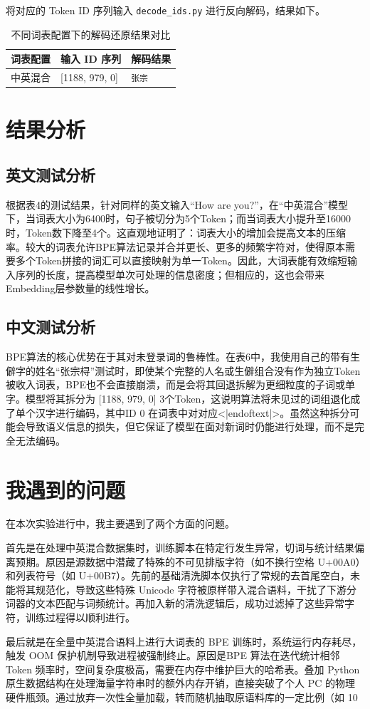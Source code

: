 \documentclass[a4paper,12pt]{ctexart} %
\begin{document}
将对应的 Token ID 序列输入 \texttt{decode\_ids.py} 进行反向解码，结果如下。

\begin{table}[H]
    \centering
    \begin{tabular}{p{} p{} p{}}
        \toprule
        词表配置 & 输入 ID 序列 & 解码结果 \\
        \midrule
        中英混合 & [1188, 979, 0] & \texttt{张宗 } \\
        \bottomrule
    \end{tabular}
    \caption{不同词表配置下的解码还原结果对比}
\end{table}



\section{结果分析}
\subsection{英文测试分析}
根据表4的测试结果，针对同样的英文输入“How are you?”，在“中英混合”模型下，当词表大小为6400时，句子被切分为5个Token；而当词表大小提升至16000时，Token数下降至4个。这直观地证明了：词表大小的增加会提高文本的压缩率。较大的词表允许BPE算法记录并合并更长、更多的频繁字符对，使得原本需要多个Token拼接的词汇可以直接映射为单一Token。因此，大词表能有效缩短输入序列的长度，提高模型单次可处理的信息密度；但相应的，这也会带来Embedding层参数量的线性增长。

\subsection{中文测试分析}
BPE算法的核心优势在于其对未登录词的鲁棒性。在表6中，我使用自己的带有生僻字的姓名“张宗桪”测试时，即使某个完整的人名或生僻组合没有作为独立Token被收入词表，BPE也不会直接崩溃，而是会将其回退拆解为更细粒度的子词或单字。模型将其拆分为 [1188, 979, 0] 3个Token，这说明算法将未见过的词组退化成了单个汉字进行编码，其中ID 0 在词表中对对应<|endoftext|>。虽然这种拆分可能会导致语义信息的损失，但它保证了模型在面对新词时仍能进行处理，而不是完全无法编码。

\section{我遇到的问题}
在本次实验进行中，我主要遇到了两个方面的问题。

首先是在处理中英混合数据集时，训练脚本在特定行发生异常，切词与统计结果偏离预期。原因是源数据中潜藏了特殊的不可见排版字符（如不换行空格 U+00A0）和列表符号（如 U+00B7）。先前的基础清洗脚本仅执行了常规的去首尾空白，未能将其规范化，导致这些特殊 Unicode 字符被原样带入混合语料，干扰了下游分词器的文本匹配与词频统计。再加入新的清洗逻辑后，成功过滤掉了这些异常字符，训练过程得以顺利进行。

最后就是在全量中英混合语料上进行大词表的 BPE 训练时，系统运行内存耗尽，触发 OOM 保护机制导致进程被强制终止。原因是BPE 算法在迭代统计相邻 Token 频率时，空间复杂度极高，需要在内存中维护巨大的哈希表。叠加 Python 原生数据结构在处理海量字符串时的额外内存开销，直接突破了个人 PC 的物理硬件瓶颈。通过放弃一次性全量加载，转而随机抽取原语料库的一定比例（如 10%
\end{document}
